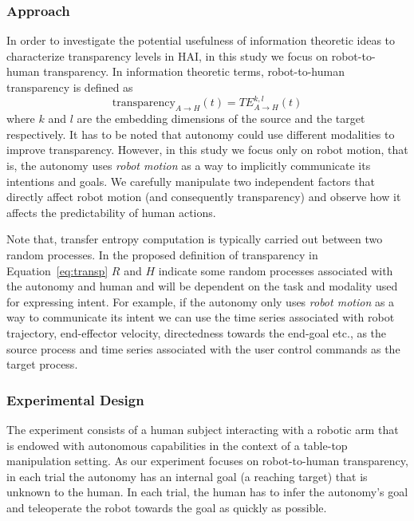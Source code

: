 \documentclass[12pt]{article}
\begin{document}
\subsubsection{Approach}
In order to investigate the potential usefulness of information theoretic ideas to characterize transparency levels in HAI, in this study we focus on robot-to-human transparency. In information theoretic terms, robot-to-human transparency is defined as 
\begin{equation}\label{eq:transp}
\text{transparency}_{A \rightarrow H}(t) = TE_{A \rightarrow H}^{k,l}(t)
\end{equation}
where $k$ and $l$ are the embedding dimensions of the source and the target respectively. 
It has to be noted that autonomy could use different modalities to improve transparency. However, in this study we focus only on robot motion, that is, the autonomy uses \textit{robot motion} as a way to implicitly communicate its intentions and goals. We carefully manipulate two independent factors that directly affect robot motion (and consequently transparency) and observe how it affects the predictability of human actions. 

Note that, transfer entropy computation is typically carried out between two random processes. In the proposed definition of transparency in Equation~\ref{eq:transp} $R$ and $H$ indicate some random processes associated with the autonomy and human and will be dependent on the task and modality used for expressing intent. For example, if the autonomy only uses \textit{robot motion} as a way to communicate its intent we can use the time series associated with robot trajectory, end-effector velocity, directedness towards the end-goal etc., as the source process and time series associated with the user control commands as the target process. 
%
%
%
%

\subsubsection{Experimental Design}

The experiment consists of a human subject interacting with a robotic arm that is endowed with autonomous capabilities in the context of a table-top manipulation setting. As our experiment focuses on robot-to-human transparency, in each trial the autonomy has an internal goal (a reaching target) that is unknown to the human. In each trial, the human has to infer the autonomy's goal and teleoperate the robot towards the goal as quickly as possible. 
\end{document}
